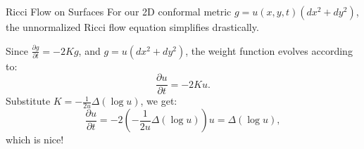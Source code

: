 \documentclass[aspectratio=1610,10pt]{beamer}
\begin{document}
  \begin{frame}{Ricci Flow on Surfaces}
    For our 2D conformal metric $g = u(x,y,t)(dx^2 + dy^2)$, the unnormalized Ricci flow equation simplifies drastically.

    Since $\frac{\partial g}{\partial t} = -2Kg$, and $g = u(dx^2+dy^2)$, the weight function evolves according to:
    \[%
      \frac{\partial u}{\partial t} = -2Ku
    .\]%
    Substitute $K = -\frac{1}{2u}\Delta (\log u)$, we get:
    \[%
      \frac{\partial u}{\partial t} = -2 \left(-\frac{1}{2u}\Delta (\log u)\right) u = \Delta (\log u)
    ,\]%
    which is nice!
  \end{frame}
\end{document}
